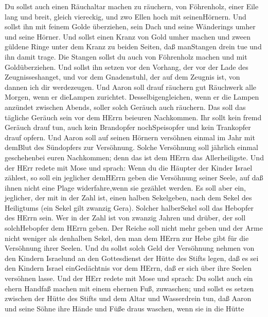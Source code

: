 Du sollst auch einen Räuchaltar machen zu räuchern, von
Föhrenholz,  einer Eile lang und breit, gleich viereckig,
und zwo Ellen hoch mit seinenHörnern.  Und sollst ihn mit
feinem Golde überziehen, sein Dach und seine Wänderings umher und seine
Hörner. Und sollst einen Kranz von Gold umher machen  und
zween güldene Ringe unter dem Kranz zu beiden Seiten, daß manStangen
drein tue und ihn damit trage.  Die Stangen sollst du auch
von Föhrenholz machen und mit Goldüberziehen.  Und sollst
ihn setzen vor den Vorhang, der vor der Lade des Zeugnisseshanget, und
vor dem Gnadenstuhl, der auf dem Zeugnis ist, von dannen ich dir
werdezeugen.  Und Aaron soll drauf räuchern gut Räuchwerk
alle Morgen, wenn er dieLampen zurichtet. 
Desselbigengleichen, wenn er die Lampen anzündet zwischen Abends, soller
solch Geräuch auch räuchern. Das soll das tägliche Geräuch sein vor dem
HErrn beieuren Nachkommen.  Ihr sollt kein fremd Geräuch
drauf tun, auch kein Brandopfer nochSpeisopfer und kein Trankopfer drauf
opfern.  Und Aaron soll auf seinen Hörnern versöhnen einmal
im Jahr mit demBlut des Sündopfers zur Versöhnung. Solche Versöhnung
soll jährlich einmal geschehenbei euren Nachkommen; denn das ist dem
HErrn das Allerheiligste.  Und der HErr redete mit Mose und
sprach:  Wenn du die Häupter der Kinder Israel zählest, so
soll ein jeglicher demHErrn geben die Versöhnung seiner Seele, auf daß
ihnen nicht eine Plage widerfahre,wenn sie gezählet werden.
 Es soll aber ein, jeglicher, der mit in der Zahl ist,
einen halben Sekelgeben, nach dem Sekel des Heiligtums (ein Sekel gilt
zwanzig Gera). Solcher halberSekel soll das Hebopfer des HErrn sein.
 Wer in der Zahl ist von zwanzig Jahren und drüber, der
soll solchHebopfer dem HErrn geben.  Der Reiche soll nicht
mehr geben und der Arme nicht weniger als denhalben Sekel, den man dem
HErrn zur Hebe gibt für die Versöhnung ihrer Seelen.  Und
du sollst solch Geld der Versöhnung nehmen von den Kindern Israelund an
den Gottesdienst der Hütte des Stifts legen, daß es sei den Kindern
Israel einGedächtnis vor dem HErrn, daß er sich über ihre Seelen
versöhnen lasse.  Und der HErr redete mit Mose und sprach:
 Du sollst auch ein ehern Handfaß machen mit einem ehernen
Fuß, zuwaschen; und sollst es setzen zwischen der Hütte des Stifts und
dem Altar und Wasserdrein tun,  daß Aaron und seine Söhne
ihre Hände und Füße draus waschen,  wenn sie in die Hütte
